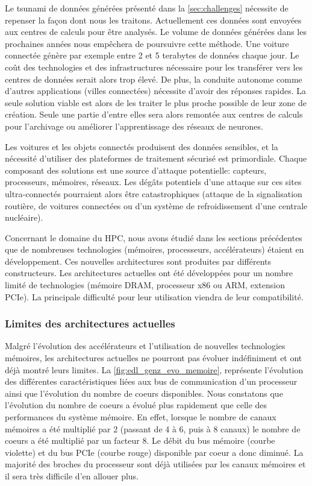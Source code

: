         Le tsunami de données générées présenté dans la \autoref{sec:challenges} nécessite de repenser la façon dont nous les traitons. Actuellement ces données sont envoyées aux centres de calculs pour être analysés. Le volume de données générées dans les prochaines années nous empêchera de poursuivre cette méthode. Une voiture connectée génère par exemple entre 2 et 5 terabytes de données chaque jour. Le coût des technologies et des infrastructures nécessaire pour les transférer vers les centres de données serait alors trop élevé. De plus, la conduite autonome comme d'autres applications (villes connectées) nécessite d'avoir des réponses rapides. La seule solution viable est alors de les traiter le plus proche possible de leur zone de création. Seule une partie d'entre elles sera alors remontée aux centres de calculs pour l'archivage ou améliorer l'apprentissage des réseaux de neurones.
        
        Les voitures et les objets connectés produisent des données sensibles, et la nécessité d'utiliser des plateformes de traitement sécurisé est primordiale. Chaque composant des solutions est une source d’attaque potentielle: capteurs, processeurs, mémoires, réseaux. Les dégâts potentiels d'une attaque sur ces sites ultra-connectés pourraient alors être catastrophiques (attaque de la signalisation routière, de voitures connectées ou d'un système de refroidissement d'une centrale nucléaire).
    
        Concernant le domaine du HPC, nous avons étudié dans les sections précédentes que de nombreuses technologies (mémoires, processeurs, accélérateurs) étaient en développement. Ces nouvelles architectures sont produites par différents constructeurs. Les architectures actuelles ont été développées pour un nombre limité de technologies (mémoire DRAM, processeur x86 ou ARM, extension PCIe). La principale difficulté pour leur utilisation viendra de leur compatibilité. 
        
       
                
    \subsubsection{Limites des architectures actuelles}
        Malgré l'évolution des accélérateurs et l'utilisation de nouvelles technologies mémoires, les architectures actuelles ne pourront pas évoluer indéfiniment et ont déjà montré leurs limites. La \autoref{fig:edl_genz_evo_memoire}, représente l'évolution des différentes caractéristiques liées aux bus de communication d'un processeur ainsi que l'évolution du nombre de coeurs disponibles. Nous constatons que l'évolution du nombre de coeurs a évolué plus rapidement que celle des performances du système mémoire. En effet, lorsque le nombre de canaux mémoires a été multiplié par 2 (passant de 4 à 6, puis à 8 canaux) le nombre de coeurs a été multiplié par un facteur 8.  Le débit du bus mémoire (courbe violette) et du bus PCIe (courbe rouge) disponible par coeur a donc diminué. La majorité des broches du processeur sont déjà utilisées par les canaux mémoires et il sera très difficile d'en allouer plus. 
        
